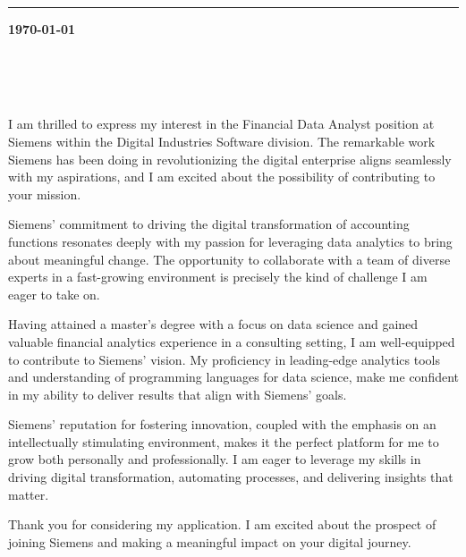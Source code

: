 \documentclass{cover_class}
\begin{document}
\hfill
{}
\vspace{12pt}
\hrule
\vspace{12pt}

\noindent\textbf{\today}
\vspace{1em}

\\
\\
\\

\begin{spacing}{1.4}


\vspace{6pt}

I am thrilled to express my interest in the Financial Data Analyst position at Siemens within the Digital Industries Software division. The remarkable work Siemens has been doing in revolutionizing the digital enterprise aligns seamlessly with my aspirations, and I am excited about the possibility of contributing to your mission.

Siemens' commitment to driving the digital transformation of accounting functions resonates deeply with my passion for leveraging data analytics to bring about meaningful change. The opportunity to collaborate with a team of diverse experts in a fast-growing environment is precisely the kind of challenge I am eager to take on.

Having attained a master's degree with a focus on data science and gained valuable financial analytics experience in a consulting setting, I am well-equipped to contribute to Siemens' vision. My proficiency in leading-edge analytics tools and understanding of programming languages for data science, make me confident in my ability to deliver results that align with Siemens' goals.

Siemens' reputation for fostering innovation, coupled with the emphasis on an intellectually stimulating environment, makes it the perfect platform for me to grow both personally and professionally. I am eager to leverage my skills in driving digital transformation, automating processes, and delivering insights that matter.

Thank you for considering my application. I am excited about the prospect of joining Siemens and making a meaningful impact on your digital journey.

\vspace{6pt}

\vspace{6pt}
\end{spacing}
\end{document}
